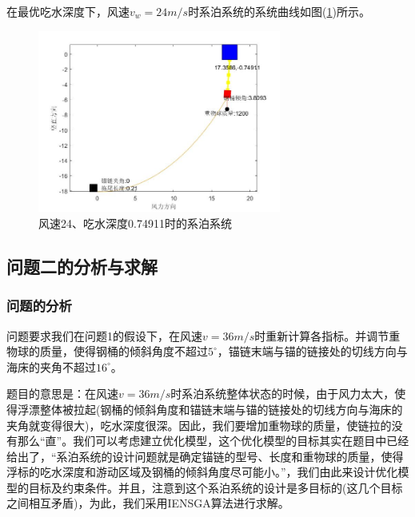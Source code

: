             在最优吃水深度下，风速$v_w=24m/s$时系泊系统的系统曲线如图(\ref{风速24、吃水深度0.74911时的系泊系统})所示。
            \begin{figure}[H]
                \centering
                \includegraphics[width=8cm]{images/v_wind_24_h_xitong.jpg}
                \caption{风速24、吃水深度0.74911时的系泊系统}
                \label{风速24、吃水深度0.74911时的系泊系统}
            \end{figure}


    \subsection{问题二的分析与求解}
        \subsubsection{问题的分析}
            \par
            问题要求我们在问题1的假设下，在风速$v=36m/s$时重新计算各指标。并调节重物球的质量，使得钢桶的倾斜角度不超过$5^\circ$，锚链末端与锚的链接处的切线方向与海床的夹角不超过$16^\circ$。
            \par
            题目的意思是：在风速$v=36m/s$时系泊系统整体状态的时候，由于风力太大，使得浮漂整体被拉起(钢桶的倾斜角度和锚链末端与锚的链接处的切线方向与海床的夹角就变得很大)，吃水深度很深。因此，我们要增加重物球的质量，使链拉的没有那么“直”。我们可以考虑建立优化模型，这个优化模型的目标其实在题目中已经给出了，“系泊系统的设计问题就是确定锚链的型号、长度和重物球的质量，使得浮标的吃水深度和游动区域及钢桶的倾斜角度尽可能小。”，我们由此来设计优化模型的目标及约束条件。并且，注意到这个系泊系统的设计是多目标的(这几个目标之间相互矛盾)，为此，我们采用IENSGA算法进行求解。

